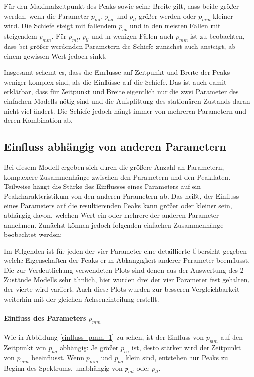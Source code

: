 Für den Maximalzeitpunkt des Peaks sowie seine Breite gilt, dass beide größer werden, wenn die Parameter $p_{ml}$, $p_{aa}$ und $p_{ll}$ größer werden oder $p_{mm}$ kleiner wird. 
Die Schiefe steigt mit fallendem $p_{aa}$ und in den meisten Fällen mit steigendem $p_{mm}$. Für $p_{ml}$, $p_{ll}$ und in wenigen Fällen auch $p_{mm}$ ist zu beobachten, dass bei größer werdenden Parametern die Schiefe zunächst auch ansteigt, ab einem gewissen Wert jedoch sinkt.

Insgesamt scheint es, dass die Einflüsse auf Zeitpunkt und Breite der Peaks weniger komplex sind, als die Einflüsse auf die Schiefe. Das ist auch damit erklärbar, dass für Zeitpunkt und Breite eigentlich nur die zwei Parameter des einfachen Modells nötig sind und die Aufsplittung des stationären Zustands daran nicht viel ändert. Die Schiefe jedoch hängt immer von mehreren Parametern und deren Kombination ab.

\subsection{Einfluss abhängig von anderen Parametern}

Bei diesem Modell ergeben sich durch die größere Anzahl an Parametern, komplexere Zusammenhänge zwischen den Parametern und den Peakdaten. Teilweise hängt die Stärke des Einflusses eines Parameters auf ein Peakcharakteristikum von den anderen Parametern ab. Das heißt, der Einfluss eines Parameters auf die resultierenden Peaks kann größer oder kleiner sein, abhängig davon, welchen Wert ein oder mehrere der anderen Parameter annehmen.
Zunächst können jedoch folgenden einfachen Zusammenhänge beobachtet werden:


Im Folgenden ist für jeden der vier Parameter eine detaillierte Übersicht gegeben welche Eigenschaften der Peaks er in Abhängigkeit anderer Parameter beeinflusst. Die zur Verdeutlichung verwendeten Plots sind denen aus der Auswertung des 2-Zustände Modells sehr ähnlich, hier wurden drei der vier Parameter fest gehalten, der vierte wird variiert. Auch diese Plots wurden zur besseren Vergleichbarkeit weiterhin mit der gleichen Achseneinteilung erstellt. 

\paragraph*{Einfluss des Parameters $p_{mm}$}
Wie in Abbildung \ref{einfluss_pmm_1} zu sehen, ist der Einfluss von $p_{mm}$ auf den Zeitpunkt von $p_{aa}$ abhängig: Je größer $p_{aa}$ ist, desto stärker wird der Zeitpunkt von $p_{mm}$ beeinflusst. Wenn $p_{mm}$ und $p_{aa}$ klein sind, entstehen nur Peaks zu Beginn des Spektrums, unabhängig von $p_{ml}$ oder $p_{ll}$.

